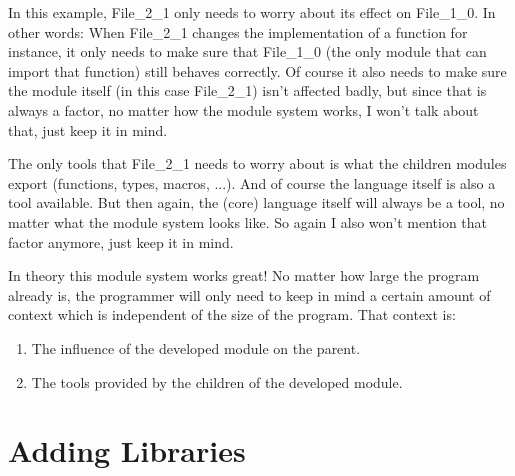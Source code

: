 \documentclass{article}
\begin{document}
In this example, File\_2\_1 only needs to worry about its effect on File\_1\_0. In other words: When File\_2\_1 changes the implementation of a function for instance, it only needs to make sure that File\_1\_0 (the only module that can import that function) still behaves correctly. Of course it also needs to make sure the module itself (in this case File\_2\_1) isn’t affected badly, but since that is always a factor, no matter how the module system works, I won’t talk about that, just keep it in mind.

The only tools that File\_2\_1 needs to worry about is what the children modules export (functions, types, macros, ...). And of course the language itself is also a tool available. But then again, the (core) language itself will always be a tool, no matter what the module system looks like. So again I also won’t mention that factor anymore, just keep it in mind.

In theory this module system works great! No matter how large the program already is, the programmer will only need to keep in mind a certain amount of context which is independent of the size of the program. That context is:

\begin{enumerate}
    \item The influence of the developed module on the parent.
    \item The tools provided by the children of the developed module.
\end{enumerate}


\section{Adding Libraries}
\end{document}
